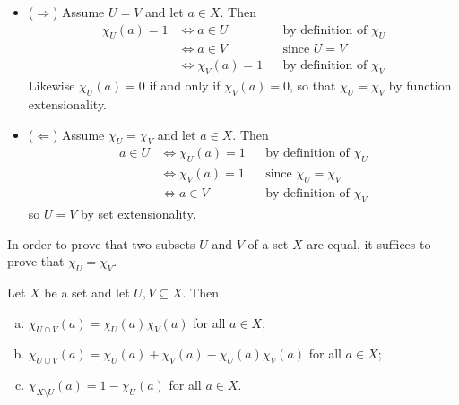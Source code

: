 \begin{cproof}
\fixlistskip
\begin{itemize}
\item ($\Rightarrow$)
Assume $U=V$ and let $a \in X$. Then
\begin{align*}
\chi_U(a) = 1 & \Leftrightarrow a \in U && \text{by definition of $\chi_U$} \\
&\Leftrightarrow a \in V && \text{since $U=V$} \\
&\Leftrightarrow \chi_V(a) = 1 && \text{by definition of $\chi_V$}
\end{align*}
Likewise $\chi_U(a) = 0$ if and only if $\chi_V(a) = 0$, so that $\chi_U = \chi_V$ by function extensionality.

\item ($\Leftarrow$) Assume $\chi_U = \chi_V$ and let $a \in X$. Then
\begin{align*}
a \in U & \Leftrightarrow \chi_U(a) = 1 && \text{by definition of $\chi_U$} \\
&\Leftrightarrow \chi_V(a) = 1 && \text{since $\chi_U = \chi_V$} \\
&\Leftrightarrow a \in V && \text{by definition of $\chi_V$}
\end{align*}
so $U=V$ by set extensionality.
\end{itemize}
\end{cproof}

\begin{strategy}
\label{strSetIdentitiesFromCharacteristicFunctions}
In order to prove that two subsets $U$ and $V$ of a set $X$ are equal, it suffices to prove that $\chi_U = \chi_V$.
\end{strategy}

\begin{theorem}
\label{thmSetIdentitiesFromCharacteristicFunctions}
Let $X$ be a set and let $U,V \subseteq X$. Then
\begin{enumerate}[(a)]
\item $\chi_{U \cap V}(a) = \chi_U(a) \chi_V(a)$ for all $a \in X$;
\item $\chi_{U \cup V}(a) = \chi_U(a) + \chi_V(a) - \chi_U(a)\chi_V(a)$ for all $a \in X$;
\item $\chi_{X \setminus U}(a) = 1 - \chi_U(a)$ for all $a \in X$.
\end{enumerate}
\end{theorem}

